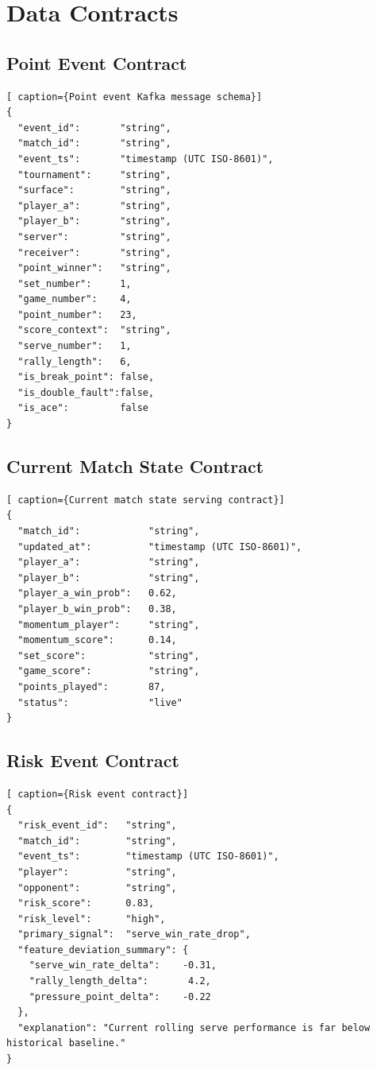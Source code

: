 \documentclass[11pt,a4paper]{article}
\begin{document}
\section{Data Contracts}

\subsection{Point Event Contract}

\begin{lstlisting}[ caption={Point event Kafka message schema}]
{
  "event_id":       "string",
  "match_id":       "string",
  "event_ts":       "timestamp (UTC ISO-8601)",
  "tournament":     "string",
  "surface":        "string",
  "player_a":       "string",
  "player_b":       "string",
  "server":         "string",
  "receiver":       "string",
  "point_winner":   "string",
  "set_number":     1,
  "game_number":    4,
  "point_number":   23,
  "score_context":  "string",
  "serve_number":   1,
  "rally_length":   6,
  "is_break_point": false,
  "is_double_fault":false,
  "is_ace":         false
}
\end{lstlisting}

\subsection{Current Match State Contract}

\begin{lstlisting}[ caption={Current match state serving contract}]
{
  "match_id":            "string",
  "updated_at":          "timestamp (UTC ISO-8601)",
  "player_a":            "string",
  "player_b":            "string",
  "player_a_win_prob":   0.62,
  "player_b_win_prob":   0.38,
  "momentum_player":     "string",
  "momentum_score":      0.14,
  "set_score":           "string",
  "game_score":          "string",
  "points_played":       87,
  "status":              "live"
}
\end{lstlisting}

\subsection{Risk Event Contract}

\begin{lstlisting}[ caption={Risk event contract}]
{
  "risk_event_id":   "string",
  "match_id":        "string",
  "event_ts":        "timestamp (UTC ISO-8601)",
  "player":          "string",
  "opponent":        "string",
  "risk_score":      0.83,
  "risk_level":      "high",
  "primary_signal":  "serve_win_rate_drop",
  "feature_deviation_summary": {
    "serve_win_rate_delta":    -0.31,
    "rally_length_delta":       4.2,
    "pressure_point_delta":    -0.22
  },
  "explanation": "Current rolling serve performance is far below historical baseline."
}
\end{lstlisting}
\end{document}
